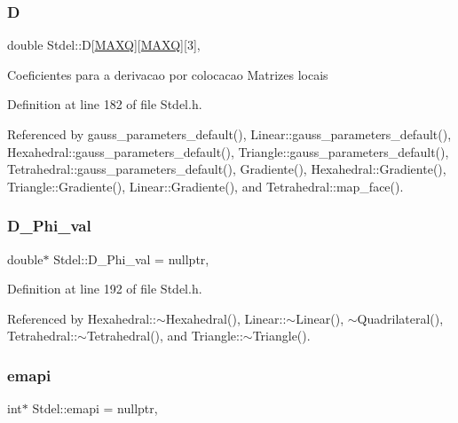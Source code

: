 \subsubsection{\texorpdfstring{D}{D}}
{\footnotesize\ttfamily double Stdel\+::D\mbox{[}\hyperlink{MyOptions_8h_af708e94d886ba3f59582612949cac702}{M\+A\+XQ}\mbox{]}\mbox{[}\hyperlink{MyOptions_8h_af708e94d886ba3f59582612949cac702}{M\+A\+XQ}\mbox{]}\mbox{[}3\mbox{]}\hspace{0.3cm}{\ttfamily [protected]}, {\ttfamily [inherited]}}

Coeficientes para a derivacao por colocacao Matrizes locais 

Definition at line 182 of file Stdel.\+h.



Referenced by gauss\+\_\+parameters\+\_\+default(), Linear\+::gauss\+\_\+parameters\+\_\+default(), Hexahedral\+::gauss\+\_\+parameters\+\_\+default(), Triangle\+::gauss\+\_\+parameters\+\_\+default(), Tetrahedral\+::gauss\+\_\+parameters\+\_\+default(), Gradiente(), Hexahedral\+::\+Gradiente(), Triangle\+::\+Gradiente(), Linear\+::\+Gradiente(), and Tetrahedral\+::map\+\_\+face().

\mbox{\label{classStdel_a80a6c89c61bfef1160257e97b3ffb0a2}} 
\subsubsection{\texorpdfstring{D\+\_\+\+Phi\+\_\+val}{D\_Phi\_val}}
{\footnotesize\ttfamily double$\ast$ Stdel\+::\+D\+\_\+\+Phi\+\_\+val = nullptr\hspace{0.3cm}{\ttfamily [protected]}, {\ttfamily [inherited]}}



Definition at line 192 of file Stdel.\+h.



Referenced by Hexahedral\+::$\sim$\+Hexahedral(), Linear\+::$\sim$\+Linear(), $\sim$\+Quadrilateral(), Tetrahedral\+::$\sim$\+Tetrahedral(), and Triangle\+::$\sim$\+Triangle().

\mbox{\label{classStdel_a9ba8eb743aeb36984b7c4ececa837e16}} 
\subsubsection{\texorpdfstring{emapi}{emapi}}
{\footnotesize\ttfamily int$\ast$ Stdel\+::emapi = nullptr\hspace{0.3cm}{\ttfamily [protected]}, {\ttfamily [inherited]}}




